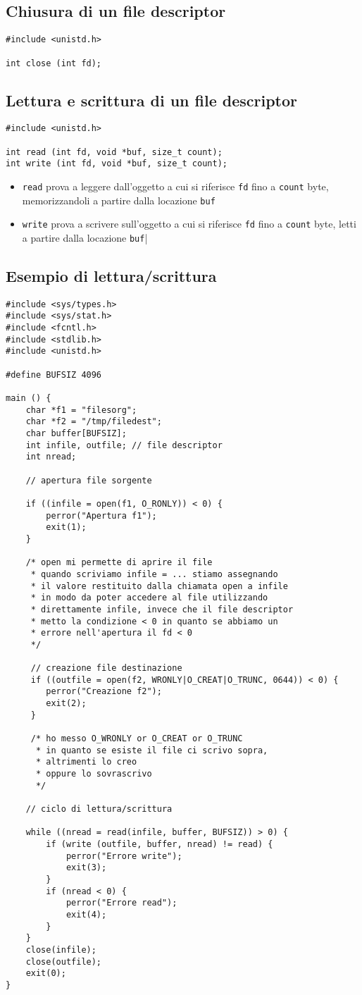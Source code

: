 \documentclass[italian,12pt,a4paper]{article}
\begin{document}
\subsection{Chiusura di un file descriptor}
\begin{lstlisting}
#include <unistd.h>

int close (int fd);
\end{lstlisting}
\subsection{Lettura e scrittura di un file descriptor}
\begin{lstlisting}
#include <unistd.h>

int read (int fd, void *buf, size_t count);
int write (int fd, void *buf, size_t count);
\end{lstlisting}
\begin{itemize}
	\item \verb|read| prova a leggere dall'oggetto a cui si riferisce \verb|fd| fino a \verb|count| byte, memorizzandoli a partire dalla locazione \verb|buf|
	\item \verb|write| prova a scrivere sull'oggetto a cui si riferisce \verb|fd| fino a \verb|count| byte, letti a partire dalla locazione \verb|buf||
\end{itemize}
\subsection{Esempio di lettura/scrittura}
\begin{lstlisting}[xleftmargin=-1.5cm]
#include <sys/types.h>
#include <sys/stat.h>
#include <fcntl.h>
#include <stdlib.h>
#include <unistd.h>

#define BUFSIZ 4096

main () {
	char *f1 = "filesorg";
	char *f2 = "/tmp/filedest";
	char buffer[BUFSIZ];
	int infile, outfile; // file descriptor
	int nread;
	
	// apertura file sorgente
	
	if ((infile = open(f1, O_RONLY)) < 0) {
		perror("Apertura f1");
		exit(1);
	}
	
	/* open mi permette di aprire il file
	 * quando scriviamo infile = ... stiamo assegnando
	 * il valore restituito dalla chiamata open a infile
	 * in modo da poter accedere al file utilizzando
	 * direttamente infile, invece che il file descriptor
	 * metto la condizione < 0 in quanto se abbiamo un 
	 * errore nell'apertura il fd < 0
	 */
	 
	 // creazione file destinazione
	 if ((outfile = open(f2, WRONLY|O_CREAT|O_TRUNC, 0644)) < 0) {
	 	perror("Creazione f2");
	 	exit(2);
	 }
	 
	 /* ho messo O_WRONLY or O_CREAT or O_TRUNC
	  * in quanto se esiste il file ci scrivo sopra, 
	  * altrimenti lo creo
	  * oppure lo sovrascrivo
	  */
	
	// ciclo di lettura/scrittura 
	
	while ((nread = read(infile, buffer, BUFSIZ)) > 0) {
		if (write (outfile, buffer, nread) != read) {
			perror("Errore write");
			exit(3);
		}
		if (nread < 0) {
			perror("Errore read");
			exit(4);
		}
	}
	close(infile);
	close(outfile);
	exit(0);
}
\end{lstlisting}
\end{document}
